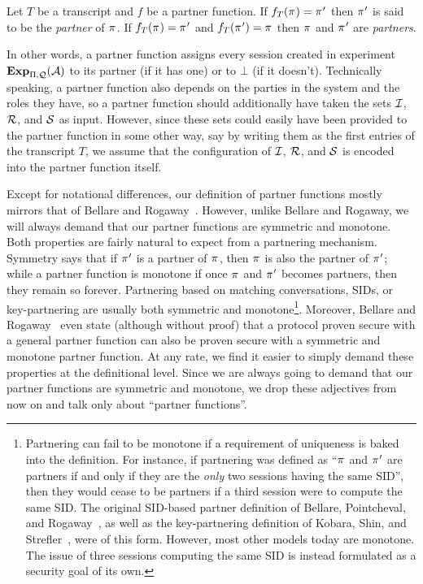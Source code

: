 \begin{definition}[Partnering]
Let $T$ be a transcript and $f$ be a partner function.
If $f_T(\oracle) = \oracle'$ then $\oracle'$ is said to be the \emph{partner} of $\oracle$.
If $f_T(\oracle) = \oracle'$ and $f_T(\oracle') = \oracle$ then $\oracle$ and $\oracle'$ are \emph{partners}.
\end{definition}

In other words,
a partner function assigns every session created in experiment $\mathbf{Exp}_{\mathrm{\Pi},\mathcal{Q}}^{}(\mathcal{A})$ to its partner 
(if it has one) or to $\bot$ (if it doesn't).
Technically speaking,
a partner function also depends on the parties in the system and the roles they have,
so a partner function should additionally have taken the sets $\mathcal{I}$, $\mathcal{R}$, and $\mathcal{S}$ as  input.
However,
since these sets could easily have been provided to the partner function in some other way,
say by writing them as the first entries of the transcript $T$,
we assume that the configuration of $\mathcal{I}$, $\mathcal{R}$, and $\mathcal{S}$ is encoded into the partner function itself. 

Except for notational differences,
our definition of partner functions mostly mirrors that of Bellare and Rogaway~\cite{STOC:BelRog95}.
However,
unlike Bellare and Rogaway,
we will always demand that our partner functions are symmetric and monotone.
Both properties are fairly natural to expect from a partnering mechanism.
Symmetry says that if $\oracle'$ is a partner of $\oracle$,
then $\oracle$ is also the partner of $\oracle'$;
while a partner function is monotone if once $\oracle$ and $\oracle'$ becomes partners,
then they remain so forever.
Partnering based on matching conversations,
SIDs,
or key-partnering are usually both symmetric and monotone\footnote{Partnering 
can fail to be monotone if a requirement of uniqueness is baked into the definition.
For instance,
if partnering was defined as ``$\oracle$ and $\oracle'$ are partners if and only if they are the \emph{only} two sessions having the same SID'',
then they would cease to be partners if a third session were to compute the same SID.
The original SID-based partner definition of Bellare, Pointcheval, and Rogaway~\cite{EC:BelPoiRog00},
as well as the key-partnering definition of Kobara, Shin, and Strefler~\cite{ASIACCS:KobShiStr09},
were of this form.
However,
most other models today are monotone.
The issue of three sessions computing the same SID is instead formulated as a security goal of its own.
}.
Moreover,
Bellare and Rogaway~\cite[Thm~5]{STOC:BelRog95} even state (although without proof) 
that a protocol proven secure with a general partner function can also be proven secure with a symmetric and monotone partner function.
At any rate,
we find it easier to simply demand these properties at the definitional level.
Since we are always going to demand that our partner functions are symmetric and monotone,
we drop these adjectives from now on and talk only about ``partner functions''.




